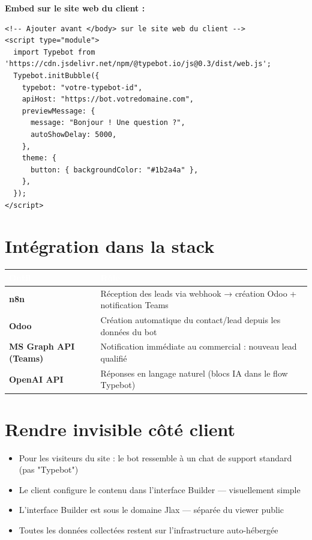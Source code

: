 \documentclass[11pt, a4paper]{article}
\begin{document}
\textbf{Embed sur le site web du client :}
\begin{lstlisting}[style=yamlstyle, caption={Script d'intégration sur le site client}]
<!-- Ajouter avant </body> sur le site web du client -->
<script type="module">
  import Typebot from 'https://cdn.jsdelivr.net/npm/@typebot.io/js@0.3/dist/web.js';
  Typebot.initBubble({
    typebot: "votre-typebot-id",
    apiHost: "https://bot.votredomaine.com",
    previewMessage: {
      message: "Bonjour ! Une question ?",
      autoShowDelay: 5000,
    },
    theme: {
      button: { backgroundColor: "#1b2a4a" },
    },
  });
</script>
\end{lstlisting}

\section{Intégration dans la stack}

\begin{center}
\renewcommand{\arraystretch}{1.4}
\begin{tabularx}{\linewidth}{>{\bfseries}p{2.8cm} X}
\toprule
\rowcolor{tabheader}
\textcolor{white}{\textbf{Outil}} & \textcolor{white}{\textbf{Rôle}} \\
\midrule
n8n & Réception des leads via webhook → création Odoo + notification Teams \\
\rowcolor{rowgray}
Odoo & Création automatique du contact/lead depuis les données du bot \\
MS Graph API (Teams) & Notification immédiate au commercial : nouveau lead qualifié \\
\rowcolor{rowgray}
OpenAI API & Réponses en langage naturel (blocs IA dans le flow Typebot) \\
\bottomrule
\end{tabularx}
\end{center}

\section{Rendre invisible côté client}

\begin{itemize}
  \item Pour les visiteurs du site : le bot ressemble à un chat de support standard (pas "Typebot")
  \item Le client configure le contenu dans l'interface Builder — visuellement simple
  \item L'interface Builder est sous le domaine Jlax — séparée du viewer public
  \item Toutes les données collectées restent sur l'infrastructure auto-hébergée
\end{itemize}
\end{document}
